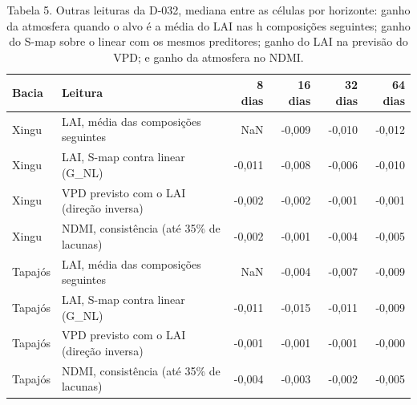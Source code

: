 \begin{table}
\caption{Tabela 5. Outras leituras da D-032, mediana entre as células por horizonte: ganho da atmosfera quando o alvo é a média do LAI nas h composições seguintes; ganho do S-map sobre o linear com os mesmos preditores; ganho do LAI na previsão do VPD; e ganho da atmosfera no NDMI.}
\label{tab:12_floresta_atmosfera::escalas_outras}
\begin{tabular}{llrrrr}
\toprule
Bacia & Leitura & 8 dias & 16 dias & 32 dias & 64 dias \\
\midrule
Xingu & LAI, média das composições seguintes & NaN & -0,009 & -0,010 & -0,012 \\
Xingu & LAI, S-map contra linear (G\_NL) & -0,011 & -0,008 & -0,006 & -0,010 \\
Xingu & VPD previsto com o LAI (direção inversa) & -0,002 & -0,002 & -0,001 & -0,001 \\
Xingu & NDMI, consistência (até 35\% de lacunas) & -0,002 & -0,001 & -0,004 & -0,005 \\
Tapajós & LAI, média das composições seguintes & NaN & -0,004 & -0,007 & -0,009 \\
Tapajós & LAI, S-map contra linear (G\_NL) & -0,011 & -0,015 & -0,011 & -0,009 \\
Tapajós & VPD previsto com o LAI (direção inversa) & -0,001 & -0,001 & -0,001 & -0,000 \\
Tapajós & NDMI, consistência (até 35\% de lacunas) & -0,004 & -0,003 & -0,002 & -0,005 \\
\bottomrule
\end{tabular}
\end{table}
